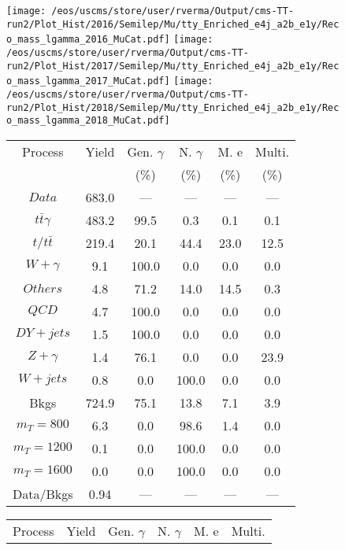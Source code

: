 \begin{figure}
\centering
\texttt{[image: /eos/uscms/store/user/rverma/Output/cms-TT-run2/Plot\_Hist/2016/Semilep/Mu/tty\_Enriched\_e4j\_a2b\_e1y/Reco\_mass\_lgamma\_2016\_MuCat.pdf]}
\texttt{[image: /eos/uscms/store/user/rverma/Output/cms-TT-run2/Plot\_Hist/2017/Semilep/Mu/tty\_Enriched\_e4j\_a2b\_e1y/Reco\_mass\_lgamma\_2017\_MuCat.pdf]}
\texttt{[image: /eos/uscms/store/user/rverma/Output/cms-TT-run2/Plot\_Hist/2018/Semilep/Mu/tty\_Enriched\_e4j\_a2b\_e1y/Reco\_mass\_lgamma\_2018\_MuCat.pdf]}
\begin{minipage}[c]{0.32\textwidth}
\centering
\tiny{
\begin{tabular}{cccccc}
\hline
Process & Yield & Gen. $\gamma$ & N. $\gamma$ & M. e & Multi. \\
 &  & (\%) & (\%) & (\%) & (\%)  \\
\hline
                                                                      $ Data $ &  683.0 &  --- &  --- &  --- &  ---\\
$ t\bar{t}\gamma $ &  483.2 &  99.5 &  0.3 &  0.1 &  0.1\\
$ t/t\bar{t} $ &  219.4 &  20.1 &  44.4 &  23.0 &  12.5\\
$ W+\gamma $ &  9.1 &  100.0 &  0.0 &  0.0 &  0.0\\
$ Others $ &  4.8 &  71.2 &  14.0 &  14.5 &  0.3\\
$ QCD $ &  4.7 &  100.0 &  0.0 &  0.0 &  0.0\\
$ DY+jets $ &  1.5 &  100.0 &  0.0 &  0.0 &  0.0\\
$ Z+\gamma $ &  1.4 &  76.1 &  0.0 &  0.0 &  23.9\\
$ W+jets $ &  0.8 &  0.0 &  100.0 &  0.0 &  0.0\\
Bkgs &  724.9 &  75.1 &  13.8 &  7.1 &  3.9\\
$ m_{T} = 800 $ &  6.3 &  0.0 &  98.6 &  1.4 &  0.0\\
$ m_{T} = 1200 $ &  0.1 &  0.0 &  100.0 &  0.0 &  0.0\\
$ m_{T} = 1600 $ &  0.0 &  0.0 &  100.0 &  0.0 &  0.0\\
Data/Bkgs &  0.94 &  --- &  --- &  --- &  ---\\
\hline
\end{tabular}
}
\end{minipage}
\begin{minipage}[c]{0.32\textwidth}
\centering
\tiny{
\begin{tabular}{cccccc}
\hline
Process & Yield & Gen. $\gamma$ & N. $\gamma$ & M. e & Multi. \\

\end{tabular}}
\end{minipage}
\end{figure}
